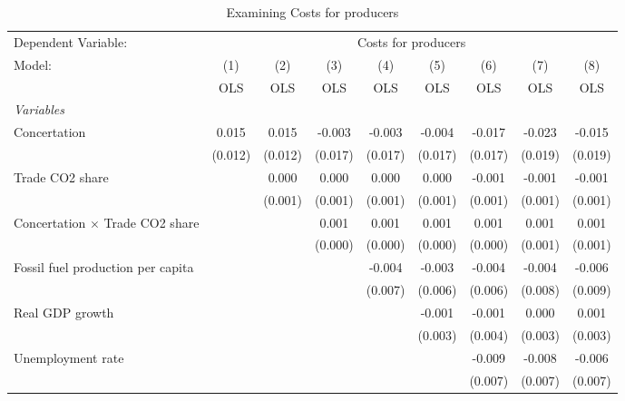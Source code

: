
\begin{table}[htbp]
   \caption{Examining Costs for producers}
   \centering
   \begin{tabular}{lcccccccc}
      \toprule
      Dependent Variable: & \multicolumn{8}{c}{Costs for producers}\\
      Model:                                  & (1)     & (2)     & (3)     & (4)     & (5)     & (6)     & (7)     & (8)\\  
                                              &  OLS    & OLS     & OLS     & OLS     & OLS     & OLS     & OLS     & OLS\\  
      \midrule
      \emph{Variables}\\
      Concertation                            & 0.015   & 0.015   & -0.003  & -0.003  & -0.004  & -0.017  & -0.023  & -0.015\\   
                                              & (0.012) & (0.012) & (0.017) & (0.017) & (0.017) & (0.017) & (0.019) & (0.019)\\   
      Trade CO2 share                         &         & 0.000   & 0.000   & 0.000   & 0.000   & -0.001  & -0.001  & -0.001\\   
                                              &         & (0.001) & (0.001) & (0.001) & (0.001) & (0.001) & (0.001) & (0.001)\\   
      Concertation $\times$ Trade CO2 share   &         &         & 0.001   & 0.001   & 0.001   & 0.001   & 0.001   & 0.001\\   
                                              &         &         & (0.000) & (0.000) & (0.000) & (0.000) & (0.001) & (0.001)\\   
      Fossil fuel production per capita       &         &         &         & -0.004  & -0.003  & -0.004  & -0.004  & -0.006\\   
                                              &         &         &         & (0.007) & (0.006) & (0.006) & (0.008) & (0.009)\\   
      Real GDP growth                         &         &         &         &         & -0.001  & -0.001  & 0.000   & 0.001\\   
                                              &         &         &         &         & (0.003) & (0.004) & (0.003) & (0.003)\\   
      Unemployment rate                       &         &         &         &         &         & -0.009  & -0.008  & -0.006\\   
                                              &         &         &         &         &         & (0.007) & (0.007) & (0.007)\\   

\end{tabular}
\end{table}
